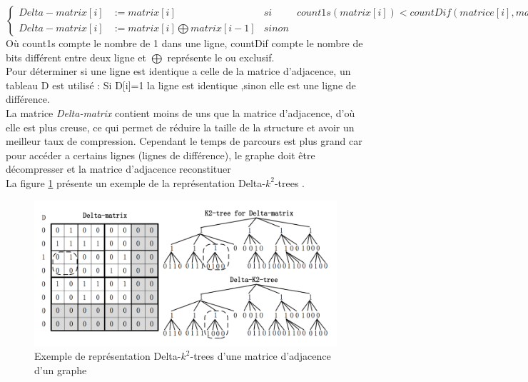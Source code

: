 $\left\{
\begin{array}{llcl}
Delta-matrix[i] & := matrix[i] & si & count1s(matrix[i]) < countDif(matrice[i],matrix[i-1]) \\
Delta-matrix[i] & := matrix[i] \bigoplus matrix[i-1] &  sinon
\end{array}
\right.$\\

Où count1s compte le nombre de 1 dans une ligne, countDif compte le nombre de bits différent entre deux ligne et $\bigoplus$ représente le ou exclusif.\\
Pour déterminer si une ligne est identique a celle de la matrice d'adjacence, un tableau D est utilisé : Si D[i]=1 la ligne est identique ,sinon elle est une ligne de différence.\\
La matrice \textit{Delta-matrix} contient moins de uns que la matrice d'adjacence, d'où elle est plus creuse, ce qui permet de réduire la taille de la structure et avoir un meilleur taux de compression. Cependant le temps de parcours est plus grand car pour accéder a certains lignes (lignes de différence), le graphe doit être décompresser et la matrice d'adjacence reconstituer\\

La figure \ref{k2-trees-delta} présente un exemple de la représentation Delta-$k^2$-trees \citep{zhang2014delta}.


\begin{figure}[H]
\begin{center}
\includegraphics[height=150 pt, width=380 pt]{./ressources/image/k2-trees-delta.png} 
\end{center}
\caption{Exemple de représentation Delta-$k^2$-trees d'une matrice d'adjacence d'un graphe}
\label{k2-trees-delta}
\end{figure}

